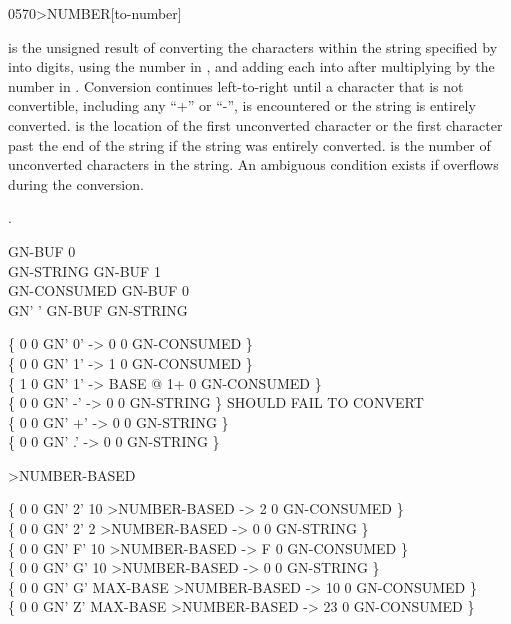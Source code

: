 \begin{worddef}[toNUMBER]{0570}{>NUMBER}[to-number]
\item {}

	 is the unsigned result of converting the characters
	within the string specified by  into digits,
	using the number in , and adding each into 
	after multiplying  by the number in .
	Conversion continues left-to-right until a character that is not
	convertible, including any ``+'' or ``-'', is encountered or the
	string is entirely converted.
	 is the location of the first unconverted character
	or the first character past the end of the string if the string was
	entirely converted.  is the number of unconverted
	characters in the string. An ambiguous condition exists if
	 overflows during the conversion.

\see {}.

	\begin{defer}
	\testing
		 GN-BUF 0  \\
		\word{:} GN-STRING	 GN-BUF 1 \word{;} \\
		\word{:} GN-CONSUMED GN-BUF  0 \word{;} \\
		\word{:} GN'		 \word{[CHAR]} '    GN-BUF   GN-STRING \word{;}

		\{ 0 0 GN' 0'  ->         0 0 GN-CONSUMED \} \\
		\{ 0 0 GN' 1'  ->         1 0 GN-CONSUMED \} \\
		\{ 1 0 GN' 1'  -> BASE @ 1+ 0 GN-CONSUMED \} \\
		\{ 0 0 GN' -'  ->         0 0 GN-STRING   \} \tab {} SHOULD FAIL TO CONVERT \\
		\{ 0 0 GN' +'  ->         0 0 GN-STRING   \} \\
		\{ 0 0 GN' .'  ->         0 0 GN-STRING   \}

		\word{:} >NUMBER-BASED \\
		\tab {}    \word{!}    \word{!} \word{;}

		\{ 0 0 GN' 2'       10 >NUMBER-BASED ->  2 0 GN-CONSUMED \} \\
		\{ 0 0 GN' 2'        2 >NUMBER-BASED ->  0 0 GN-STRING   \} \\
		\{ 0 0 GN' F'       10 >NUMBER-BASED ->  F 0 GN-CONSUMED \} \\
		\{ 0 0 GN' G'       10 >NUMBER-BASED ->  0 0 GN-STRING   \} \\
		\{ 0 0 GN' G' MAX-BASE >NUMBER-BASED -> 10 0 GN-CONSUMED \} \\
		\{ 0 0 GN' Z' MAX-BASE >NUMBER-BASED -> 23 0 GN-CONSUMED \}


\end{defer}
\end{worddef}
